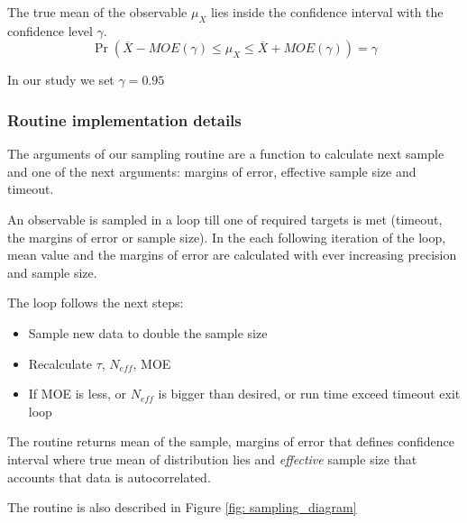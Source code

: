 The true mean of the observable $\mu_X$ lies inside the confidence interval with the confidence level $\gamma$.
\begin{equation}
    \Pr(\overline{X} - MOE(\gamma) \leq \mu_X \leq \overline{X} + MOE(\gamma)) = \gamma
\end{equation}

In our study we set $\gamma = 0.95$


\subsubsection{Routine implementation details}

The arguments of our sampling routine are a function to calculate next sample and one of the next arguments: margins of error, effective sample size and timeout.

An observable is sampled in a loop till one of required targets is met (timeout, the margins of error or sample size). 
In the each following iteration of the loop, mean value and the margins of error are calculated with ever increasing precision and sample size. 

The loop follows the next steps:
\begin{itemize}
    \item Sample new data to double the sample size
    \item Recalculate $\tau$, $N_{eff}$, MOE
    \item If MOE is less, or $N_{eff}$ is bigger than desired, or run time exceed timeout exit loop
\end{itemize}

The routine returns mean of the sample, margins of error that defines confidence interval where true mean of distribution lies and \emph{effective} sample size that accounts that data is autocorrelated.

The routine is also described in Figure \ref{fig: sampling_diagram}

